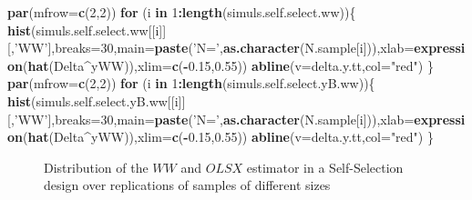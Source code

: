 \documentclass[]{book}
\newenvironment{Shaded}{\begin{snugshade}}{\end{snugshade}}
\newcommand{\KeywordTok}[1]{\textcolor[rgb]{0.13,0.29,0.53}{\textbf{#1}}}
\newcommand{\DataTypeTok}[1]{\textcolor[rgb]{0.13,0.29,0.53}{#1}}
\newcommand{\DecValTok}[1]{\textcolor[rgb]{0.00,0.00,0.81}{#1}}
\newcommand{\FloatTok}[1]{\textcolor[rgb]{0.00,0.00,0.81}{#1}}
\newcommand{\StringTok}[1]{\textcolor[rgb]{0.31,0.60,0.02}{#1}}
\newcommand{\ControlFlowTok}[1]{\textcolor[rgb]{0.13,0.29,0.53}{\textbf{#1}}}
\newcommand{\OperatorTok}[1]{\textcolor[rgb]{0.81,0.36,0.00}{\textbf{#1}}}
\newcommand{\NormalTok}[1]{#1}
\theoremstyle{definition}
\theoremstyle{definition}
\theoremstyle{definition}
\theoremstyle{remark}
\begin{document}
\begin{Shaded}
\begin{Highlighting}[]
\KeywordTok{par}\NormalTok{(}\DataTypeTok{mfrow=}\KeywordTok{c}\NormalTok{(}\DecValTok{2}\NormalTok{,}\DecValTok{2}\NormalTok{))}
\ControlFlowTok{for}\NormalTok{ (i }\ControlFlowTok{in} \DecValTok{1}\OperatorTok{:}\KeywordTok{length}\NormalTok{(simuls.self.select.ww))\{}
  \KeywordTok{hist}\NormalTok{(simuls.self.select.ww[[i]][,}\StringTok{'WW'}\NormalTok{],}\DataTypeTok{breaks=}\DecValTok{30}\NormalTok{,}\DataTypeTok{main=}\KeywordTok{paste}\NormalTok{(}\StringTok{'N='}\NormalTok{,}\KeywordTok{as.character}\NormalTok{(N.sample[i])),}\DataTypeTok{xlab=}\KeywordTok{expression}\NormalTok{(}\KeywordTok{hat}\NormalTok{(Delta}\OperatorTok{^}\NormalTok{yWW)),}\DataTypeTok{xlim=}\KeywordTok{c}\NormalTok{(}\OperatorTok{-}\FloatTok{0.15}\NormalTok{,}\FloatTok{0.55}\NormalTok{))}
  \KeywordTok{abline}\NormalTok{(}\DataTypeTok{v=}\NormalTok{delta.y.tt,}\DataTypeTok{col=}\StringTok{"red"}\NormalTok{)}
\NormalTok{\}}
\KeywordTok{par}\NormalTok{(}\DataTypeTok{mfrow=}\KeywordTok{c}\NormalTok{(}\DecValTok{2}\NormalTok{,}\DecValTok{2}\NormalTok{))}
\ControlFlowTok{for}\NormalTok{ (i }\ControlFlowTok{in} \DecValTok{1}\OperatorTok{:}\KeywordTok{length}\NormalTok{(simuls.self.select.yB.ww))\{}
  \KeywordTok{hist}\NormalTok{(simuls.self.select.yB.ww[[i]][,}\StringTok{'WW'}\NormalTok{],}\DataTypeTok{breaks=}\DecValTok{30}\NormalTok{,}\DataTypeTok{main=}\KeywordTok{paste}\NormalTok{(}\StringTok{'N='}\NormalTok{,}\KeywordTok{as.character}\NormalTok{(N.sample[i])),}\DataTypeTok{xlab=}\KeywordTok{expression}\NormalTok{(}\KeywordTok{hat}\NormalTok{(Delta}\OperatorTok{^}\NormalTok{yWW)),}\DataTypeTok{xlim=}\KeywordTok{c}\NormalTok{(}\OperatorTok{-}\FloatTok{0.15}\NormalTok{,}\FloatTok{0.55}\NormalTok{))}
  \KeywordTok{abline}\NormalTok{(}\DataTypeTok{v=}\NormalTok{delta.y.tt,}\DataTypeTok{col=}\StringTok{"red"}\NormalTok{)}
\NormalTok{\}}
\end{Highlighting}
\end{Shaded}

\begin{figure}[htbp]

{\centering {}

}

\caption{Distribution of the $WW$ and $OLSX$ estimator in a Self-Selection design over replications of samples of different sizes}\label{fig:montecarlohistselfselectww}
\end{figure}
\end{document}
